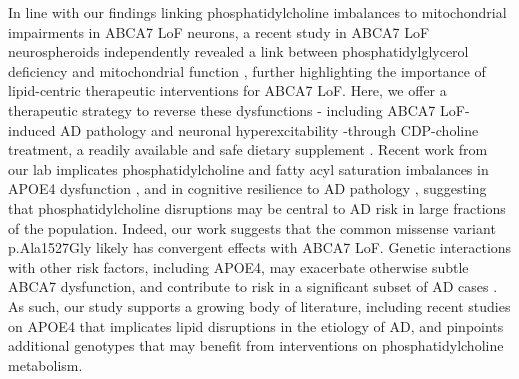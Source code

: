 In line with our findings linking phosphatidylcholine imbalances to mitochondrial impairments in ABCA7 LoF neurons, a recent study in ABCA7 LoF neurospheroids independently revealed a link between phosphatidylglycerol deficiency and mitochondrial function \cite{Kawatani2023-vf}, further highlighting the importance of lipid-centric therapeutic interventions for ABCA7 LoF. Here, we offer a therapeutic strategy to reverse these dysfunctions - including ABCA7 LoF-induced AD pathology and neuronal hyperexcitability -through CDP-choline treatment, a readily available and safe dietary supplement \cite{Gavrilova2018-oi,Zeisel2009-xv,Blusztajn2017-nv}.  Recent work from our lab implicates phosphatidylcholine and fatty acyl saturation imbalances in APOE4 dysfunction \cite{Sienski2021-zt}, and in cognitive resilience to AD pathology \cite{Mathys2024-ex}, suggesting that phosphatidylcholine disruptions may be central to AD risk in large fractions of the population. Indeed, our work suggests that the common missense variant p.Ala1527Gly likely has convergent effects with ABCA7 LoF. Genetic interactions with other risk factors, including APOE4, may exacerbate otherwise subtle ABCA7 dysfunction, and contribute to risk in a significant subset of AD cases \cite{Wang2021-oa,Hemani2013-zr,Haig2011-vs,Zuk2012-uz}. As such, our study supports a growing body of literature, including recent studies on APOE4 \cite{Haney2024-fx,Victor2022-tl} that implicates lipid disruptions in the etiology of AD, and pinpoints additional genotypes that may benefit from interventions on phosphatidylcholine metabolism.



